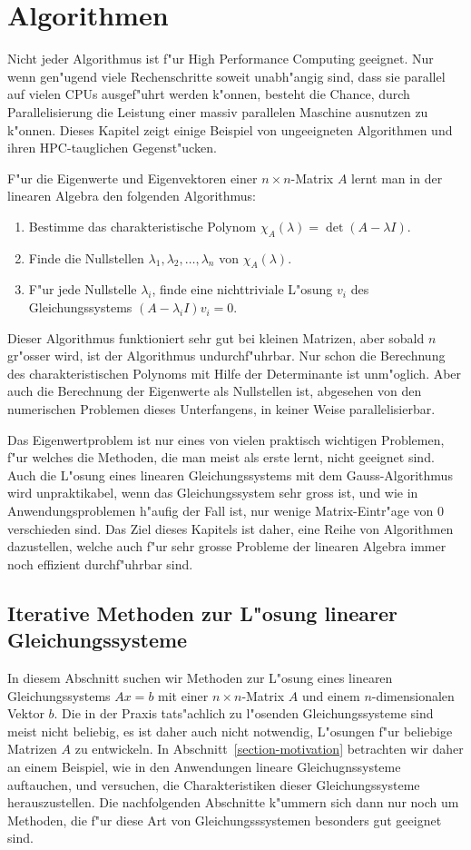 \chapter{Algorithmen}
Nicht jeder Algorithmus ist f"ur High Performance Computing geeignet.
Nur wenn gen"ugend viele Rechenschritte soweit unabh"angig sind, dass sie
parallel auf vielen CPUs ausgef"uhrt werden k"onnen, besteht die
Chance, durch Parallelisierung die Leistung einer massiv parallelen Maschine
ausnutzen zu k"onnen. Dieses Kapitel zeigt einige Beispiel von ungeeigneten
Algorithmen und ihren HPC-tauglichen Gegenst"ucken.

F"ur die Eigenwerte und Eigenvektoren einer $n\times n$-Matrix $A$ 
lernt man in der linearen Algebra den folgenden Algorithmus:
\begin{enumerate}
\item Bestimme das charakteristische Polynom
$\chi_{A}(\lambda)=\det(A-\lambda I)$.
\item Finde die Nullstellen $\lambda_1,\lambda_2,\dots,\lambda_n$ von
$\chi_A(\lambda)$.
\item F"ur jede Nullstelle $\lambda_i$, finde eine nichttriviale L"osung $v_i$
des Gleichungssystems $(A-\lambda_i I)v_i=0$.
\end{enumerate}
Dieser Algorithmus funktioniert sehr gut bei kleinen Matrizen, aber sobald
$n$ gr"osser wird, ist der Algorithmus undurchf"uhrbar.
Nur schon die Berechnung des charakteristischen Polynoms mit Hilfe
der Determinante ist unm"oglich.
Aber auch die Berechnung der Eigenwerte als Nullstellen ist, abgesehen
von den numerischen Problemen dieses Unterfangens, in keiner Weise
parallelisierbar.

Das Eigenwertproblem ist nur eines von vielen praktisch wichtigen
Problemen, f"ur welches die Methoden, die man meist als erste lernt,
nicht geeignet sind. Auch die L"osung eines linearen Gleichungssystems
mit dem Gauss-Algorithmus wird unpraktikabel, wenn das Gleichungssystem
sehr gross ist, und wie in Anwendungsproblemen h"aufig der Fall ist,
nur wenige Matrix-Eintr"age von 0 verschieden sind.
Das Ziel dieses Kapitels ist daher, eine Reihe von Algorithmen dazustellen,
welche auch f"ur sehr grosse Probleme der linearen Algebra immer noch
effizient durchf"uhrbar sind.

\section{Iterative Methoden zur L"osung linearer Gleichungssysteme}
In diesem Abschnitt suchen wir Methoden zur L"osung eines linearen
Gleichungssystems $Ax=b$ mit einer $n\times n$-Matrix $A$ und einem
$n$-dimensionalen Vektor $b$.
Die in der Praxis tats"achlich zu l"osenden Gleichungssysteme sind meist 
nicht beliebig, es ist daher auch nicht notwendig, L"osungen f"ur beliebige
Matrizen $A$ zu entwickeln.
In Abschnitt~\ref{section-motivation} betrachten wir daher an einem Beispiel,
wie in den Anwendungen lineare Gleichugnssysteme auftauchen, und versuchen,
die Charakteristiken dieser Gleichungssysteme herauszustellen. Die
nachfolgenden Abschnitte k"ummern sich dann nur noch um Methoden, die
f"ur diese Art von Gleichungsssystemen besonders gut geeignet sind.

